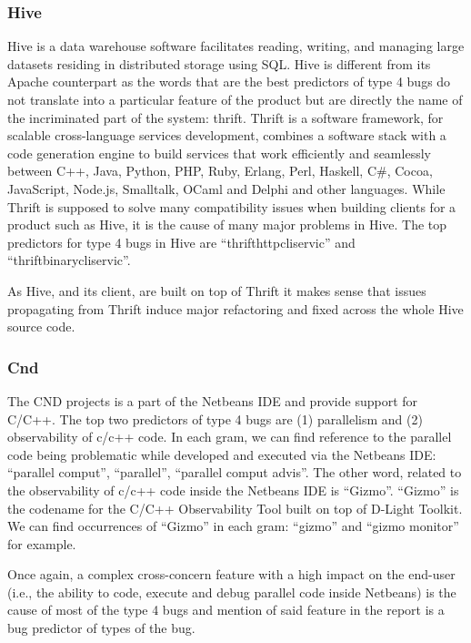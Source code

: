\documentclass[12pt]{report}
\begin{document}
\subsubsection{Hive}\label{hive}

Hive is a data warehouse software facilitates reading, writing, and
managing large datasets residing in distributed storage using SQL. Hive
is different from its Apache counterpart as the words that are the best
predictors of type 4 bugs do not translate into a particular feature of
the product but are directly the name of the incriminated part of the
system: thrift. Thrift is a software framework, for scalable
cross-language services development, combines a software stack with a
code generation engine to build services that work efficiently and
seamlessly between C++, Java, Python, PHP, Ruby, Erlang, Perl, Haskell,
C\#, Cocoa, JavaScript, Node.js, Smalltalk, OCaml and Delphi and other
languages. While Thrift is supposed to solve many compatibility issues
when building clients for a product such as Hive, it is the cause of
many major problems in Hive. The top predictors for type 4 bugs in Hive
are ``thrifthttpcliservic'' and ``thriftbinarycliservic''.

As Hive, and its client, are built on top of Thrift it makes sense that
issues propagating from Thrift induce major refactoring and fixed across
the whole Hive source code.

\subsubsection{Cnd}\label{cnd}

The CND projects is a part of the Netbeans IDE and provide support for
C/C++. The top two predictors of type 4 bugs are (1) parallelism and (2)
observability of c/c++ code. In each gram, we can find reference to the
parallel code being problematic while developed and executed via the
Netbeans IDE: ``parallel comput'', ``parallel'', ``parallel comput
advis''. The other word, related to the observability of c/c++ code
inside the Netbeans IDE is ``Gizmo''. ``Gizmo'' is the codename for the
C/C++ Observability Tool built on top of D-Light Toolkit. We can find
occurrences of ``Gizmo'' in each gram: ``gizmo'' and ``gizmo monitor''
for example.

Once again, a complex cross-concern feature with a high impact on the
end-user (i.e., the ability to code, execute and debug parallel code
inside Netbeans) is the cause of most of the type 4 bugs and mention of
said feature in the report is a bug predictor of types of the bug.
\end{document}
